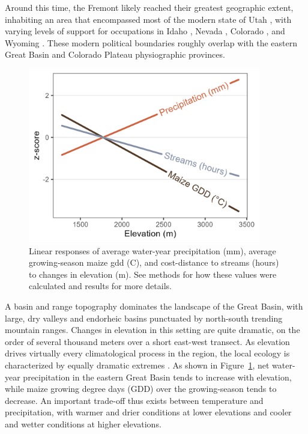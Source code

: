 \documentclass[
  number,
  preprint,
  3p]{elsarticle}
\begin{document}
Around this time, the Fremont likely reached their greatest geographic
extent, inhabiting an area that encompassed most of the modern state of
Utah \citep{janetski2011}, with varying levels of support for
occupations in Idaho \citep{dean1992prehistoric}, Nevada
\citep{hockett1998}, Colorado \citep{baker1999}, and Wyoming
\citep{hakiel1987archery, smith1992fremont}. These modern political
boundaries roughly overlap with the eastern Great Basin and Colorado
Plateau physiographic provinces.

\begin{figure}

{\centering \includegraphics[width=4in,height=\textheight]{../figures/elevation-everything.png}

}

\caption{\label{fig-elevation}Linear responses of average water-year
precipitation (mm), average growing-season maize gdd (C), and
cost-distance to streams (hours) to changes in elevation (m). See
methods for how these values were calculated and results for more
details.}

\end{figure}

A basin and range topography dominates the landscape of the Great Basin,
with large, dry valleys and endorheic basins punctuated by north-south
trending mountain ranges. Changes in elevation in this setting are quite
dramatic, on the order of several thousand meters over a short east-west
transect. As elevation drives virtually every climatological process in
the region, the local ecology is characterized by equally dramatic
extremes \citep{billings1951, grayson2011}. As shown in
Figure~\ref{fig-elevation}, net water-year precipitation in the eastern
Great Basin tends to increase with elevation, while maize growing degree
days (GDD) over the growing-season tends to decrease. An important
trade-off thus exists between temperature and precipitation, with warmer
and drier conditions at lower elevations and cooler and wetter
conditions at higher elevations.
\end{document}

